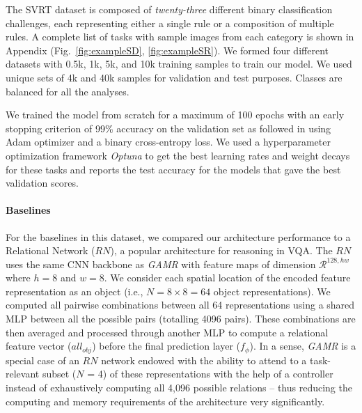 The SVRT dataset is composed of \textit{twenty-three} different binary classification challenges, each representing either a single rule or a composition of multiple rules. A complete list of tasks with sample images from each category is shown in Appendix (Fig.~\ref{fig:exampleSD}, \ref{fig:exampleSR}). We formed four different datasets with 0.5k, 1k, 5k, and 10k training samples to train our model. We used unique sets of 4k and 40k samples for validation and test purposes. Classes are balanced for all the analyses. 

We trained the model from scratch for a maximum of 100 epochs with an early stopping criterion of 99\% accuracy on the validation set as followed in \citet{vaishnav2021understanding} using Adam \citep{kingma2014adam} optimizer and a binary cross-entropy loss. We used a hyperparameter optimization framework \textit{Optuna} \citep{optuna_2019} to get the best learning rates and weight decays for these tasks and reports the test accuracy for the models that gave the best validation scores.


\paragraph{Baselines} For the baselines in this dataset, we compared our architecture performance to a Relational Network ($RN$), a popular architecture for reasoning in VQA. The $RN$ uses the same CNN backbone as \textit{GAMR} with feature maps of dimension $\mathcal{R}^{128,hw}$ where $h=8$ and $w=8$. We consider each spatial location of the encoded feature representation as an object (i.e., $N=8\times 8=64$ object representations). We computed all pairwise combinations between all 64 representations using a shared MLP between all the possible pairs (totalling 4096 pairs). These combinations are then averaged and processed through another MLP to compute a relational feature vector ($all_{obj}$) before the final prediction layer ($f_{\phi}$). In a sense, \textit{GAMR} is a special case of an $RN$ network endowed with the ability to attend to a task-relevant subset ($N$ = 4) of these representations with the help of a controller instead of exhaustively computing all 4,096 possible relations -- thus reducing the computing and memory requirements of the architecture very significantly. 

